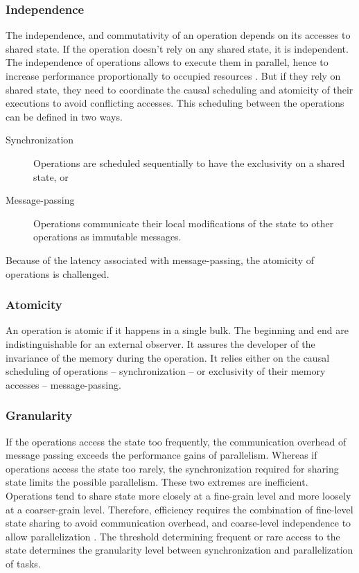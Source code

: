 \subsubsection{Independence} \label{chapter3:definitions:efficiency:independence}

The independence, and commutativity of an operation depends on its accesses to shared state.
If the operation doesn't rely on any shared state, it is independent.
The independence of operations allows to execute them in parallel, hence to increase performance proportionally to occupied resources \cite{Amdahl1967,Gunther1993}.
But if they rely on shared state, they need to coordinate the causal scheduling and atomicity of their executions to avoid conflicting accesses.
This scheduling between the operations can be defined in two ways.
\begin{description}
\item[Synchronization] Operations are scheduled sequentially to have the exclusivity on a shared state, or
\item[Message-passing] Operations communicate their local modifications of the state to other operations as immutable messages.
\end{description}

Because of the latency associated with message-passing, the atomicity of operations is challenged.

\subsubsection{Atomicity} \label{chapter3:definitions:efficiency:atomicity}

An operation is atomic if it happens in a single bulk.
The beginning and end are indistinguishable for an external observer.
It assures the developer of the invariance of the memory during the operation.
It relies either on the causal scheduling of operations -- synchronization -- or exclusivity of their memory accesses -- message-passing.

\subsubsection{Granularity} \label{chapter3:definitions:efficiency:granularity}

If the operations access the state too frequently, the communication overhead of message passing exceeds the performance gains of parallelism.
Whereas if operations access the state too rarely, the synchronization required for sharing state limits the possible parallelism.
These two extremes are inefficient.
Operations tend to share state more closely at a fine-grain level and more loosely at a coarser-grain level.
Therefore, efficiency requires the combination of fine-level state sharing to avoid communication overhead, and coarse-level independence to allow parallelization \cite{Gustafson1988,Gunther1996,Nelson1996,Gunther2002}.
The threshold determining frequent or rare access to the state determines the granularity level between synchronization and parallelization of tasks.

